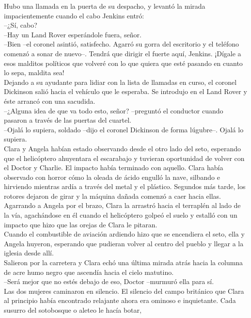 Hubo una llamada en la puerta de su despacho, y levantó la mirada
impacientemente cuando el cabo Jenkins entró:\\
--¿Sí, cabo?\\
--Hay un Land Rover esperándole fuera, señor.\\
--Bien --el coronel asintió, satisfecho. Agarró su gorra del escritorio
y el teléfono comenzó a sonar de nuevo--. Tendrá que dirigir el fuerte
aquí, Jenkins. ¡Dígale a esos malditos políticos que volveré con lo que
quiera que esté pasando en cuanto lo sepa, maldita sea!\\
Dejando a su ayudante para lidiar con la lista de llamadas en curso, el
coronel Dickinson salió hacia el vehículo que le esperaba. Se introdujo
en el Land Rover y éste arrancó con una sacudida.\\
--¿Alguna idea de que va todo esto, señor? --preguntó el conductor
cuando pasaron a través de las puertas del cuartel.\\
--Ojalá lo supiera, soldado --dijo el coronel Dickinson de forma
lúgubre--. Ojalá lo supiera.\\[2\baselineskip]Clara y Angela habían
estado observando desde el otro lado del seto, esperando que el
helicóptero ahuyentara el escarabajo y tuvieran oportunidad de volver
con el Doctor y Charlie. El impacto había terminado con aquello. Clara
había observado con horror cómo la oleada de ácido engulló la nave,
silbando e hirviendo mientras ardía a través del metal y el plástico.
Segundos más tarde, los rotores dejaron de girar y la máquina dañada
comenzó a caer hacia ellas.\\
Agarrando a Angela por el brazo, Clara la arrastró hacia el terraplén al
lado de la vía, agachándose en él cuando el helicóptero golpeó el suelo
y estalló con un impacto que hizo que las orejas de Clara le pitaran.\\
Cuando el combustible de aviación ardiendo hizo que se encendiera el
seto, ella y Angela huyeron, esperando que pudieran volver al centro del
pueblo y llegar a la iglesia desde allí.\\
Salieron por la carretera y Clara echó una última mirada atrás hacia la
columna de acre humo negro que ascendía hacia el cielo matutino.\\
--Será mejor que no estés debajo de eso, Doctor --murmuró ella para
sí.\\
Las dos mujeres caminaron en silencio. El silencio del campo británico
que Clara al principio había encontrado relajante ahora era ominoso e
inquietante. Cada susurro del sotobosque o aleteo le hacía botar,
